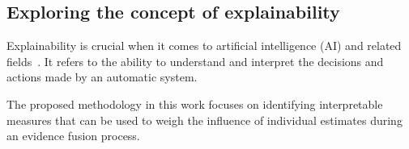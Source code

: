 \documentclass{article}
\begin{document}

   \vspace{-0.3cm}
\subsection{Exploring the concept of explainability}

Explainability is crucial when it comes to artificial intelligence (AI) and related fields~\cite{Vilone2021}. 
It refers to the ability to understand and interpret the decisions and actions made by an automatic system. 

The proposed methodology in this work focuses on identifying interpretable measures that can be used to weigh the influence of individual estimates during an evidence fusion process.
 \vspace{-0.3cm}
\end{document}
